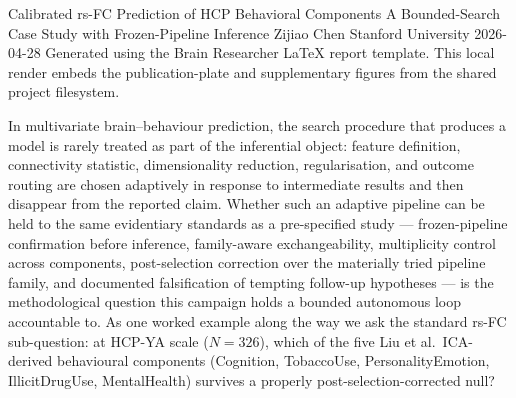 \documentclass[11pt,letterpaper]{report}
\begin{document}
\makereporttitlewithnotice
    {Calibrated rs-FC Prediction of HCP Behavioral Components}
    {A Bounded-Search Case Study with Frozen-Pipeline Inference}
    {Zijiao Chen}
    {Stanford University}
    {2026-04-28}
    {Generated using the Brain Researcher LaTeX report template. This local render embeds the publication-plate and supplementary figures from the shared project filesystem.}



\tableofcontents
\newpage

\listoffigures
\newpage


\listoftables
\newpage




In multivariate brain--behaviour prediction, the search procedure that produces a model is rarely treated as part of the inferential object: feature definition, connectivity statistic, dimensionality reduction, regularisation, and outcome routing are chosen adaptively in response to intermediate results and then disappear from the reported claim. Whether such an adaptive pipeline can be held to the same evidentiary standards as a pre-specified study --- frozen-pipeline confirmation before inference, family-aware exchangeability, multiplicity control across components, post-selection correction over the materially tried pipeline family, and documented falsification of tempting follow-up hypotheses --- is the methodological question this campaign holds a bounded autonomous loop accountable to. As one worked example along the way we ask the standard rs-FC sub-question: at HCP-YA scale ($N = 326$), which of the five Liu et al.\ ICA-derived behavioural components (Cognition, TobaccoUse, PersonalityEmotion, IllicitDrugUse, MentalHealth) survives a properly post-selection-corrected null?
\end{document}
